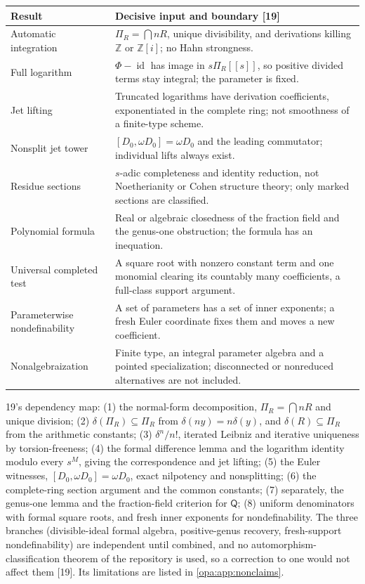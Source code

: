 \documentclass[11pt,oneside]{article}
\numberwithin{equation}{section}
\theoremstyle{definition}
\theoremstyle{remark}
\newcommand{\Z}{\mathbb Z}
\newcommand{\id}{\operatorname{id}}
\newcommand{\src}[1]{\textup{\textsf{\small[#1]}}}
\begin{document}
\begin{center}
\renewcommand{\arraystretch}{1.15}
\begin{longtable}{>{\raggedright\arraybackslash}p{}>{\raggedright\arraybackslash}p{}}
\toprule
Result & Decisive input and boundary \src{19}\\
\midrule
\endhead
Automatic integration & $\Pi_R=\bigcap nR$, unique divisibility, and derivations killing $\Z$ or $\Z[i]$; no Hahn strongness.\\
Full logarithm & $\Phi-\id$ has image in $s\Pi_R[[s]]$, so positive divided terms stay integral; the parameter is fixed.\\
Jet lifting & Truncated logarithms have derivation coefficients, exponentiated in the complete ring; not smoothness of a finite-type scheme.\\
Nonsplit jet tower & $[D_0,\omega D_0]=\omega D_0$ and the leading commutator; individual lifts always exist.\\
Residue sections & $s$-adic completeness and identity reduction, not Noetherianity or Cohen structure theory; only marked sections are
classified.\\
Polynomial formula & Real or algebraic closedness of the fraction field and the genus-one obstruction; the formula has an inequation.\\
Universal completed test & A square root with nonzero constant term and one monomial clearing its countably many coefficients, a full-class
support argument.\\
Parameterwise nondefinability & A set of parameters has a set of inner exponents; a fresh Euler coordinate fixes them and moves a new coefficient.\\
Nonalgebraization & Finite type, an integral parameter algebra and a pointed specialization; disconnected or nonreduced alternatives are not
included.\\
\bottomrule
\end{longtable}
\end{center}

19's dependency map: (1) the normal-form decomposition, $\Pi_R=\bigcap nR$ and unique division; (2) $\delta(\Pi_R)\subseteq\Pi_R$ from $\delta(ny)=n\delta(y)$, and
$\delta(R)\subseteq\Pi_R$ from the arithmetic constants; (3) $\delta^n/n!$, iterated Leibniz and iterative uniqueness by torsion-freeness; (4) the formal
difference lemma and the logarithm identity modulo every $s^M$, giving the correspondence and jet lifting; (5) the Euler witnesses, $[D_0,\omega D_0]=\omega D_0$,
exact nilpotency and nonsplitting; (6) the complete-ring section argument and the common constants; (7) separately, the genus-one lemma and the
fraction-field criterion for $\mathsf Q$; (8) uniform denominators with formal square roots, and fresh inner exponents for nondefinability. The three
branches (divisible-ideal formal algebra, positive-genus recovery, fresh-support nondefinability) are independent until combined, and no
automorphism-classification theorem of the repository is used, so a correction to one would not affect them \src{19}. Its limitations are listed in
\cref{opa:app:nonclaims}.
\end{document}
